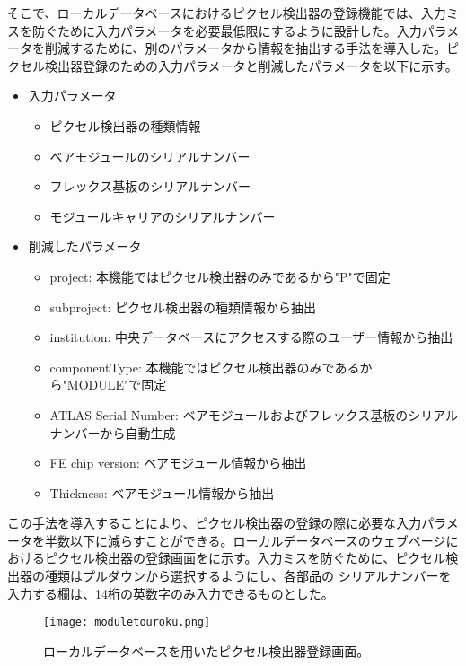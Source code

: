 そこで、ローカルデータベースにおけるピクセル検出器の登録機能では、入力ミスを防ぐために入力パラメータを必要最低限にするように設計した。入力パラメータを削減するために、別のパラメータから情報を抽出する手法を導入した。ピクセル検出器登録のための入力パラメータと削減したパラメータを以下に示す。
\begin{itemize}
  \item 入力パラメータ
  \begin{itemize}
    \item ピクセル検出器の種類情報
    \item ベアモジュールのシリアルナンバー
    \item フレックス基板のシリアルナンバー
    \item モジュールキャリアのシリアルナンバー
  \end{itemize}
  \item 削減したパラメータ
  \begin{itemize}
  \item project: 本機能ではピクセル検出器のみであるから"P"で固定
  \item subproject: ピクセル検出器の種類情報から抽出
  \item institution: 中央データベースにアクセスする際のユーザー情報から抽出
  \item componentType: 本機能ではピクセル検出器のみであるから"MODULE"で固定
  \item ATLAS Serial Number: ベアモジュールおよびフレックス基板のシリアルナンバーから自動生成
  \item FE chip version: ベアモジュール情報から抽出
  \item Thickness: ベアモジュール情報から抽出
  \end{itemize}
\end{itemize}

この手法を導入することにより、ピクセル検出器の登録の際に必要な入力パラメータを半数以下に減らすことができる。ローカルデータベースのウェブページにおけるピクセル検出器の登録画面をに示す。入力ミスを防ぐために、ピクセル検出器の種類はプルダウンから選択するようにし、各部品の
シリアルナンバーを入力する欄は、14桁の英数字のみ入力できるものとした。

\begin{figure}[tbp]
  \centering
  \texttt{[image: moduletouroku.png]}
  \caption[ローカルデータベースを用いたピクセル検出器登録画面]{ローカルデータベースを用いたピクセル検出器登録画面。}
  \label{fig:module-touroku-gamen}
\end{figure}


